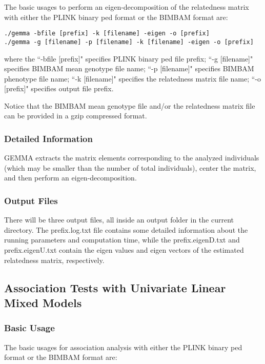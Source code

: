 \documentclass[11pt]{article}
\begin{document}
The basic usages to perform an eigen-decomposition of the relatedness
matrix with either the PLINK binary ped format or the BIMBAM format
are:
%
\begin{verbatim}
./gemma -bfile [prefix] -k [filename] -eigen -o [prefix]
./gemma -g [filename] -p [filename] -k [filename] -eigen -o [prefix]
\end{verbatim}
%
where the ``-bfile [prefix]" specifies PLINK binary ped file prefix;
``-g [filename]" specifies BIMBAM mean genotype file name; ``-p
[filename]" specifies BIMBAM phenotype file name; ``-k [filename]"
specifies the relatedness matrix file name; ``-o [prefix]" specifies
output file prefix.

Notice that the BIMBAM mean genotype file and/or the relatedness
matrix file can be provided in a gzip compressed format.

\subsubsection{Detailed Information}

GEMMA extracts the matrix elements corresponding to the analyzed
individuals (which may be smaller than the number of total
individuals), center the matrix, and then perform an
eigen-decomposition.

\subsubsection{Output Files}

There will be three output files, all inside an output folder in the
current directory. The prefix.log.txt file contains some detailed
information about the running parameters and computation time, while
the prefix.eigenD.txt and prefix.eigenU.txt contain the eigen values
and eigen vectors of the estimated relatedness matrix, respectively.

\subsection{Association Tests with Univariate Linear Mixed Models}

\subsubsection{Basic Usage}

The basic usages for association analysis with either the PLINK binary
ped format or the BIMBAM format are:
\end{document}
